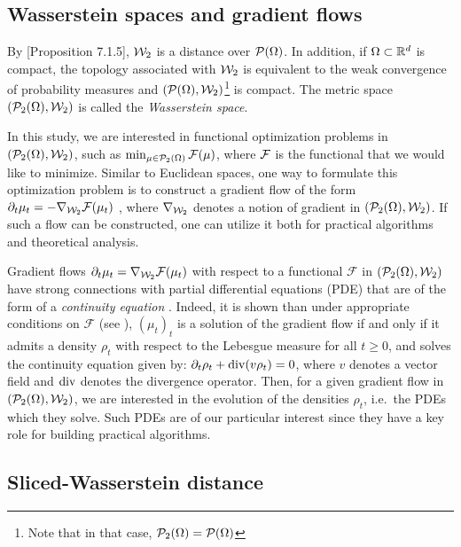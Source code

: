 \subsection{Wasserstein spaces and gradient flows}

%
By \cite{ambrosio2008gradient}[Proposition 7.1.5], ${\cal W}_2$ is a distance over ${\cal P}(\Omega)$.
In addition, if $\Omega \subset \mathbb{R}^d$ is compact, the topology associated with ${\cal W}_2$ is equivalent to the weak convergence of probability measures and $({\cal P}(\Omega),{\cal W}_2)$\footnote{Note that in that case, ${\cal P}_2(\Omega)={\cal P}(\Omega)$} is compact. The metric space $({\cal P}_2(\Omega),{\cal W}_2) $ is called the \emph{Wasserstein space}.

In this study, we are interested in functional optimization problems in $({\cal P}_2(\Omega),{\cal W}_2)$, such as $\min_{\mu\in{\cal P}_2(\Omega)} {\cal F}(\mu)$, where ${\cal F}$ is the functional that we would like to minimize. Similar to Euclidean spaces, one way to formulate this optimization problem is to construct a gradient flow of the form $\partial_t \mu_t = - \nabla_{{\cal W}_2} {\cal F}(\mu_t)$ \cite{benamou2000computational,lavenant2018dynamical}, where $\nabla_{{\cal W}_2}$ denotes a notion of gradient in $({\cal P}_2(\Omega),{\cal W}_2)$. If such a flow can be constructed, one can utilize it both for practical algorithms and theoretical analysis.

Gradient flows $\partial_t \mu_t = \nabla_{{\cal W}_2} \mathcal{F}(\mu_t)$ with respect to a functional $\mathcal{F}$ in $({\cal P}_2(\Omega),{\cal W}_2)$ have strong connections with partial differential equations (PDE) that are of the form of a \emph{continuity equation} \cite{santambrogio2017euclidean}. Indeed, it is shown than under appropriate conditions on $\mathcal{F}$ (see \eg \cite{ambrosio2008gradient}), $(\mu_t)_t$ is a solution of the gradient flow if and only if it admits a density $\rho_t$ with respect to the Lebesgue measure for all $t \geq 0$, and solves the continuity equation given by:
$\partial_t \rho_t + \operatorname{div} (v \rho_t) = 0$, %
where $v$ denotes a vector field and $\operatorname{div}$ denotes the divergence operator. Then, for a given gradient flow in $({\cal P}_2(\Omega),{\cal W}_2)$, we are interested in the evolution of the densities $\rho_t$, i.e.\ the PDEs which they solve.
%
Such PDEs are of our particular interest since they have a key role for building practical algorithms.




\subsection{Sliced-Wasserstein distance}

